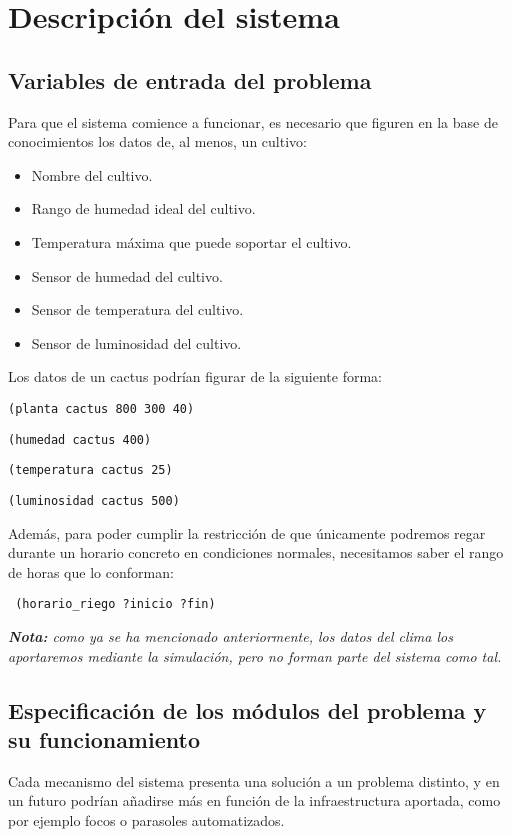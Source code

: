 \documentclass[11pt,a4paper]{article}
\begin{document}
\section{Descripción del sistema}
\subsection{Variables de entrada del problema}
Para que el sistema comience a funcionar, es necesario que figuren en la base de conocimientos los datos de, al menos, un cultivo:

\begin{itemize}
\item Nombre del cultivo.
\item Rango de humedad ideal del cultivo.
\item Temperatura máxima que puede soportar el cultivo.
\item Sensor de humedad del cultivo.
\item Sensor de temperatura del cultivo.
\item Sensor de luminosidad del cultivo.
\end{itemize}

Los datos de un cactus podrían figurar de la siguiente forma:

\medskip

\texttt{(planta cactus 800 300 40)}
    
\texttt{(humedad cactus 400)}
    
\texttt{(temperatura cactus 25)}

\texttt{(luminosidad cactus 500)}

\medskip

Además, para poder cumplir la restricción de que únicamente podremos regar durante un horario concreto en condiciones normales, necesitamos saber el rango de horas que lo conforman:

\medskip

\texttt{
(horario\_riego ?inicio ?fin)
}

\medskip

\textit{\textbf{Nota:} como ya se ha mencionado anteriormente, los datos del clima los aportaremos mediante la simulación, pero no forman parte del sistema como tal.}

\subsection{Especificación de los módulos del problema y su funcionamiento}
Cada mecanismo del sistema presenta una solución a un problema distinto, y en un futuro podrían añadirse más en función de la infraestructura aportada, como por ejemplo focos o parasoles automatizados.
\end{document}
